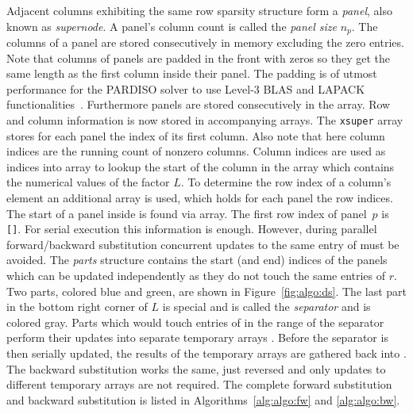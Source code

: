 Adjacent columns exhibiting the same row sparsity structure form a \textit{panel}, also known
as \textit{supernode}.
A panel's column count is called the \textit{panel size} $n_p$.
The columns of a panel are stored consecutively in memory excluding the zero
entries. 
Note that columns of panels are padded in the front with zeros so they get the 
same length as the first column inside their panel. The padding is of utmost performance
for the PARDISO solver to use Level-3 BLAS and LAPACK functionalities~\cite{20.500.11850/144477}.
 Furthermore panels are stored consecutively in the \vlnz{} array. 
Row and column information is now stored in accompanying arrays.
The \texttt{xsuper} array stores for each panel the index of its first column. 
Also note that here column indices are the running count of nonzero columns.
Column indices are used as indices into \vxlnz{} array to lookup the start of
the column in the \vlnz{} array which contains the numerical values of the factor $L$.
To determine the row index of a column's element an additional array \vindx{} is
used, which holds for each panel the row indices.
The start of a panel inside \vindx{} is found via \vxindx{} array.
The first row index of panel~$p$ is \vindx\texttt{[\vxindx[p]]}.
For serial execution this information is enough. 
However, during parallel forward/backward substitution concurrent updates to
the same entry of \vr{} must be avoided.
The \textit{parts} structure contains the start (and end) indices of the panels which can
be updated independently as they do not touch the same entries of $r$.
Two parts, colored blue and green, are shown in Figure~\ref{fig:algo:ds}.
The last part in the bottom right corner of $L$ is special and is called the 
\textit{separator} and is colored gray.
%
Parts which would touch entries of \vr{} in the range of the separator perform 
their updates into separate temporary arrays \vtemp{}.
Before the separator is then serially updated, the results of the temporary
arrays are gathered back into \vr{}. 
The backward substitution works the same, just reversed and
only updates to different temporary arrays are not required.
The complete forward substitution and backward substitution  is listed in Algorithms~\ref{alg:algo:fw} and \ref{alg:algo:bw}.
%


